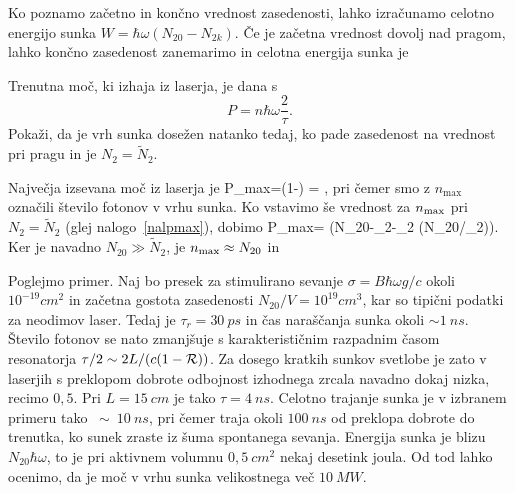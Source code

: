 Ko poznamo začetno in končno vrednost zasedenosti, lahko izračunamo 
celotno energijo sunka $W=\hbar \omega (N_{20}-N_{2k})$. Če je začetna vrednost
dovolj nad pragom, lahko končno zasedenost zanemarimo in celotna energija sunka je 
\begin{definition}
\label{nalpmax}
Trenutna moč, ki izhaja iz laserja, je dana s 
\begin{equation}
P=n \hbar \omega \frac{2}{\tau}.
\end{equation}
Pokaži, da je vrh sunka dosežen natanko tedaj, ko pade zasedenost na vrednost pri 
pragu in je $N_{2}=\tilde{N}_{2}$. 
\end{definition}

Največja izsevana moč iz laserja je 
\beq
P_{\rm max}=\left(1-\right) = 
,
\eeq
pri čemer smo z $n_\textrm{max}$ označili število fotonov v vrhu sunka. 
Ko vstavimo še vrednost za $n_{\rm max}$ pri $N_{2}=\tilde{N}_{2}$ (glej 
nalogo~\ref{nalpmax}), dobimo
\beq
P_{\rm max}=\frac {2\hbar \omega}{\tau} \left(N_{20}-_{2}-_{2}
\ln (N_{20}/_{2})\right).
\eeq
Ker je navadno $N_{20}\gg \tilde{N}_2$, je $n_{\rm max} \approx N_{20}$
in 

Poglejmo primer. Naj bo presek za stimulirano sevanje $\sigma=B\hbar \omega g/c$ 
okoli $10^{-19}\si{cm}^{2}$ in začetna gostota zasedenosti $N_{20}/V=10^{19}\si{cm}^3$,
kar so tipični podatki za neodimov laser.  Tedaj 
je $\tau_{r}=30~\si{ps}$ in čas naraščanja
sunka okoli $\sim 1~\si{ns}$. Število fotonov se nato zmanjšuje s
karakterističnim razpadnim časom resonatorja $\tau /2\sim 2L/(c(1-{\cal R}))$. 
Za dosego kratkih sunkov svetlobe je zato v laserjih s preklopom dobrote odbojnost 
izhodnega zrcala navadno dokaj nizka, recimo $0,5$. Pri $L=15~\si{cm}$ je tako $\tau=4~\si{ns}$.
Celotno trajanje sunka je v izbranem primeru tako $~\sim~10~\si{ns}$, pri
čemer traja okoli $100~\si{ns}$ od preklopa dobrote do trenutka, ko sunek zraste iz šuma
spontanega sevanja. Energija sunka je blizu $N_{20}\hbar \omega $, to je pri
aktivnem volumnu $0,5~\si{cm}^2$ nekaj desetink joula. Od tod lahko ocenimo, da je
moč v vrhu sunka velikostnega več $10~\si{MW}$.

